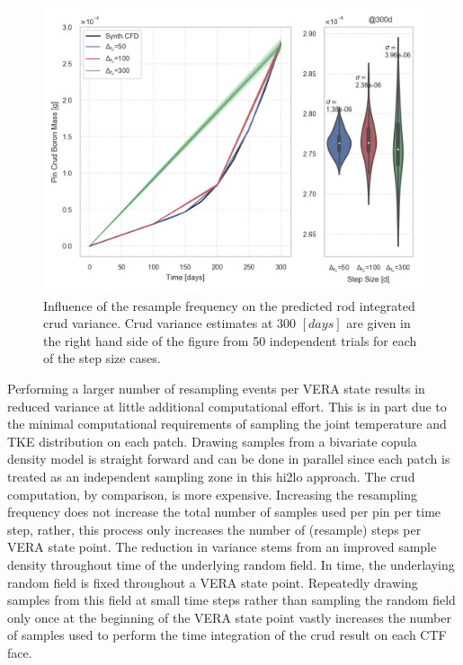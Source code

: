 \begin{figure}[H]
    \centering
    \includegraphics[width=0.7\linewidth]{figs/synth/tstep_study/cmpr_pin_totals_violin}
    \caption[Influence of the resample frequency on the predicted integrated crud variance.]{Influence of the resample frequency on the predicted rod integrated crud variance.  Crud variance estimates at 300 $[days]$ are given in the right hand side of the figure from 50 independent trials for each of the step size cases.}
    \label{fig:cmprpintotalsviolin}
\end{figure}

Performing a larger number of resampling events per VERA state results in reduced variance at little additional computational effort.
This is in part due to the minimal computational requirements of sampling the joint temperature and TKE distribution on each patch.  Drawing samples from a bivariate copula density model is straight forward and can be done in parallel since each patch is treated as an independent sampling zone in this hi2lo approach.  The crud computation, by comparison, is more expensive.  Increasing the resampling frequency does not increase the total number of samples used per pin per time step, rather, this process only increases the number of (resample) steps per VERA state point.  The reduction in variance stems from an improved sample density throughout time of the underlying random field.  In time, the underlaying random field is fixed throughout a VERA state point.  Repeatedly drawing samples from this field at small time steps rather than sampling the random field only once at the beginning of the VERA state point vastly increases the number of samples used to perform the time integration of the crud result on each CTF face.


